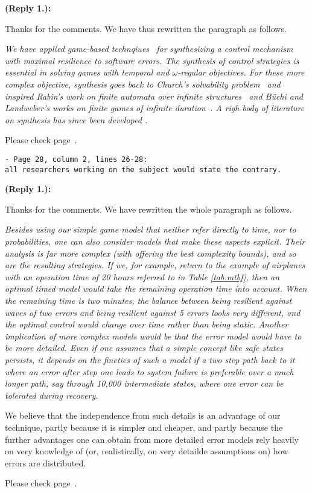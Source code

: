 \documentclass[times,10pt,twocolumn]{article}
\newcounter{cabbage0}
\newcounter{cabbage1}
\newcounter{cabbage2}
\newcounter{cabbage3}
\newcounter{bean0}
\newcounter{bean1}
\newcounter{bean2}
\newcounter{bean3}
\newcounter{bean4}
\newcounter{bean5}
\newcounter{bean6}
\newenvironment{reply1}{\begin{list}{\bf (Reply 1.\arabic{bean1}):} 
        {\usecounter{bean1}\setcounter{bean1}{\value{cabbage1}} \item \setcounter{cabbage1}{\value{bean1}} 
        }
}{\end{list}}
\begin{document}
\begin{reply1} 
Thanks for the comments. 
We have thus rewritten the paragraph as follows. 
\begin{center} 
\parbox{140mm}{\em 
We have applied game-based technqiues~\cite{Church63,PR89a,Rabin69} 
for synthesizing a control mechanism with maximal resilience to software errors.  
The synthesis of control strategies is essential in solving games with temporal and $\omega$-regular objectives.  
For these more complex objective, synthesis goes back to Church's solvability problem~\cite{Church63} and 
inspired Rabin's work on finite automata over infinite 
structures~\cite{Rabin69} and 
B\"uchi and Landweber's works on finite games 
of infinite duration~\cite{Buchi62,BL69}. 
A righ body of literature on synthesis
has since been developed \cite{AAE04,EKA08,GR09,KV00,PR89b,Rushby92,SF06}.
}
\end{center} 
Please check page~\pageref{reply1.related.work.1st.para}.  
\end{reply1} 
\begin{verbatim} 
- Page 28, column 2, lines 26-28: 
all researchers working on the subject would state the contrary.
\end{verbatim} 
\begin{reply1} 
Thanks for the comments. 
We have rewritten the whole paragraph as follows. 
\begin{center} 
\parbox{140mm}{\em 
Besides using our simple game model that neither refer directly to time, nor to probabilities, one can also consider models that make these aspects explicit.
Their analysis is far more complex (with \cite{FRSZ11} offering the best complexity bounds), and so are the resulting strategies.
If we, for example, return to the example of airplanes with an operation time of 20 hours referred to in Table \ref{tab.mtbf}, then an optimal timed model would take the remaining operation time into account.
When the remaining time is two minutes, the balance between being resilient against waves of two errors and being resilient against 5 errors looks very different, and the optimal control would change over time rather than being static.
Another implication of more complex models would be that the error model would have to be more detailed.
Even if one assumes that a simple concept like safe states persists, it depends on the fineties of such a model if a two step path back to it where an error after step one leads to system failure is preferable over a much longer path, say through 10,000 intermediate states, where one error can be tolerated during recovery.

We believe that the independence from such details is an advantage of our technique, partly because it is simpler and cheaper, and partly because the further advantages one can obtain from more detailed error models rely heavily on very knowledge of (or, realistically, on very detailde assumptions on) how errors are distributed.
}
\end{center}
Please check page~\pageref{reply1.prob.more.complex}.  
\end{reply1} 
\end{document}
